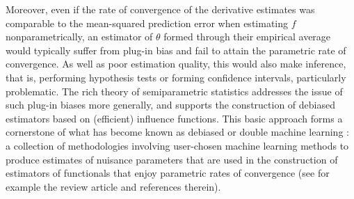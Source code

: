 \documentclass[aos]{imsart}
\begin{document}
	Moreover, even if the rate of convergence of the derivative estimates was comparable to the mean-squared prediction error when estimating $f$ nonparametrically, an estimator of $\theta$ formed through their empirical average would typically suffer from plug-in bias and fail to attain the parametric rate of convergence. As well as poor estimation quality, this would also make inference, that is, performing hypothesis tests or forming confidence intervals, particularly problematic. The rich theory of semiparametric statistics \citep{bickel1993efficient,tsiatis2006semiparametric} addresses the issue of such plug-in biases more generally, and supports the construction of debiased estimators based on (efficient) influence functions. This basic approach forms a cornerstone of what has become known as debiased or double machine learning \citep{ChernozhukovTreatment}: a collection of methodologies involving user-chosen machine learning methods to produce estimates of nuisance parameters that are used in the construction of estimators of functionals that enjoy parametric rates of convergence (see for example the review article \citet{kennedy2022semiparametric} and references therein).
	
\end{document}
